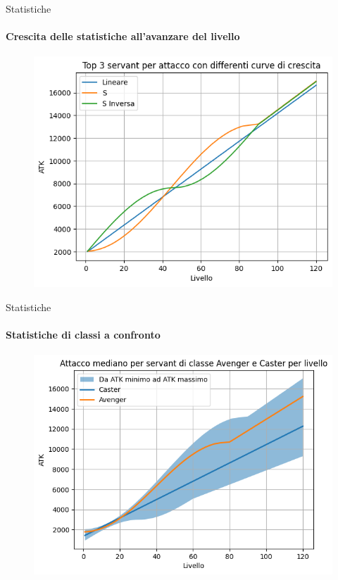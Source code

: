 \documentclass{beamer}
\begin{document}
\begin{darkframes}
  \begin{frame}{Statistiche}
    \framesubtitle{Crescita delle statistiche all'avanzare del livello}
    \begin{figure}
      \centering
      \includegraphics[scale=0.6]{./images/growth.png}
    \end{figure}
  \end{frame}

  \begin{frame}{Statistiche}
    \framesubtitle{Statistiche di classi a confronto}
    \begin{figure}
      \centering
      \includegraphics[scale=0.6]{./images/caster_vs_avenger.png}
    \end{figure}
  \end{frame}


\end{darkframes}
\end{document}
